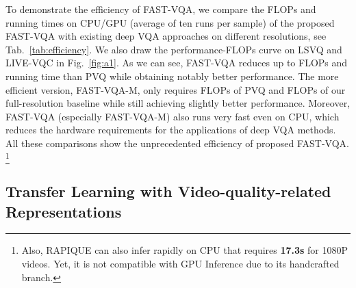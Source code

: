 \documentclass[runningheads]{llncs}
\begin{document}
To demonstrate the efficiency of FAST-VQA, we compare the FLOPs and running times on CPU/GPU (average of ten runs per sample) of the proposed FAST-VQA with existing deep VQA approaches on different resolutions, see Tab.~\ref{tab:efficiency}. We also draw the performance-FLOPs curve on LSVQ and LIVE-VQC in Fig.~\ref{fig:a1}. As we can see, FAST-VQA reduces up to  FLOPs and  running time than PVQ while obtaining notably better performance. The more efficient version, FAST-VQA-M, only requires  FLOPs of PVQ and  FLOPs of our full-resolution baseline while still achieving slightly better performance. Moreover, FAST-VQA (especially FAST-VQA-M) also runs very fast even on CPU, which reduces the hardware requirements for the applications of deep 
VQA methods. All these comparisons show the unprecedented efficiency of proposed FAST-VQA. \footnote{Also, RAPIQUE\cite{rapique} can also infer rapidly on CPU that requires \textbf{17.3s} for 1080P videos. Yet, it is not compatible with GPU Inference due to its handcrafted branch.}

\subsection{Transfer Learning with Video-quality-related Representations} 
\end{document}
